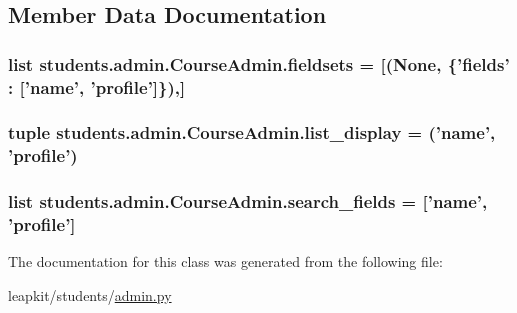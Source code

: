 \subsection{Member Data Documentation}
\hypertarget{classstudents_1_1admin_1_1_course_admin_a2d298dca126bc069d952e3b203c7ff9a}{
\subsubsection[{fieldsets}]{\setlength{\rightskip}{0pt plus 5cm}list students.\-admin.\-Course\-Admin.\-fieldsets = \mbox{[}(None, \{'fields' \-: \mbox{[}'name', 'profile'\mbox{]}\}),\mbox{]}\hspace{0.3cm}{\ttfamily [static]}}}\label{classstudents_1_1admin_1_1_course_admin_a2d298dca126bc069d952e3b203c7ff9a}
\hypertarget{classstudents_1_1admin_1_1_course_admin_a2875b817163ff5678d1325780528df79}{
\subsubsection[{list\-\_\-display}]{\setlength{\rightskip}{0pt plus 5cm}tuple students.\-admin.\-Course\-Admin.\-list\-\_\-display = ('name', 'profile')\hspace{0.3cm}{\ttfamily [static]}}}\label{classstudents_1_1admin_1_1_course_admin_a2875b817163ff5678d1325780528df79}
\hypertarget{classstudents_1_1admin_1_1_course_admin_aafd6b90008831c42064c629a6a6ff294}{
\subsubsection[{search\-\_\-fields}]{\setlength{\rightskip}{0pt plus 5cm}list students.\-admin.\-Course\-Admin.\-search\-\_\-fields = \mbox{[}'name', 'profile'\mbox{]}\hspace{0.3cm}{\ttfamily [static]}}}\label{classstudents_1_1admin_1_1_course_admin_aafd6b90008831c42064c629a6a6ff294}


The documentation for this class was generated from the following file\-:\begin{DoxyCompactItemize}
\item 
leapkit/students/\hyperlink{admin_8py}{admin.\-py}\end{DoxyCompactItemize}
